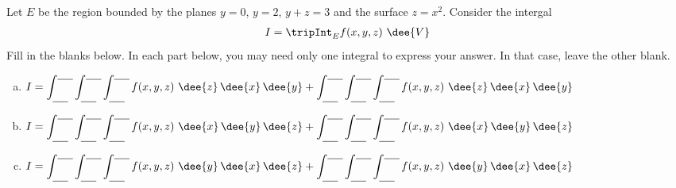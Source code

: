 \begin{question}[M200 2016D] %
Let $E$ be the region bounded by the planes $y=0$, $y=2$,
$y+z=3$ and the surface $z=x^2$. Consider the intergal
\begin{align*}
I=\tripInt_E f(x,y,z)\ \dee{V}
\end{align*}
Fill in the blanks below. In each part below,
you may need only one integral to express your answer. In that
case, leave the other blank.

\begin{enumerate}[(a)]
\item
$\displaystyle I=\int_{\underline{\ \ \ \ }}^{\underline{\ \ \ \ }}
                 \int_{\underline{\ \ \ \ }}^{\underline{\ \ \ \ }}
                 \int_{\underline{\ \ \ \ }}^{\underline{\ \ \ \ }}
                        f(x,y,z)\ \dee{z}\,\dee{x}\,\dee{y} +
                 \int_{\underline{\ \ \ \ }}^{\underline{\ \ \ \ }}
                 \int_{\underline{\ \ \ \ }}^{\underline{\ \ \ \ }}
                 \int_{\underline{\ \ \ \ }}^{\underline{\ \ \ \ }}
                        f(x,y,z)\ \dee{z}\,\dee{x}\,\dee{y} $
\medskip
\item
$\displaystyle I=\int_{\underline{\ \ \ \ }}^{\underline{\ \ \ \ }}
                 \int_{\underline{\ \ \ \ }}^{\underline{\ \ \ \ }}
                 \int_{\underline{\ \ \ \ }}^{\underline{\ \ \ \ }}
                        f(x,y,z)\ \dee{x}\,\dee{y}\,\dee{z} +
                 \int_{\underline{\ \ \ \ }}^{\underline{\ \ \ \ }}
                 \int_{\underline{\ \ \ \ }}^{\underline{\ \ \ \ }}
                 \int_{\underline{\ \ \ \ }}^{\underline{\ \ \ \ }}
                        f(x,y,z)\ \dee{x}\,\dee{y}\,\dee{z} $
\medskip
\item
$\displaystyle I=\int_{\underline{\ \ \ \ }}^{\underline{\ \ \ \ }}
                 \int_{\underline{\ \ \ \ }}^{\underline{\ \ \ \ }}
                 \int_{\underline{\ \ \ \ }}^{\underline{\ \ \ \ }}
                        f(x,y,z)\ \dee{y}\,\dee{x}\,\dee{z} +
                 \int_{\underline{\ \ \ \ }}^{\underline{\ \ \ \ }}
                 \int_{\underline{\ \ \ \ }}^{\underline{\ \ \ \ }}
                 \int_{\underline{\ \ \ \ }}^{\underline{\ \ \ \ }}
                        f(x,y,z)\ \dee{y}\,\dee{x}\,\dee{z} $

\end{enumerate}
\end{question}

%

